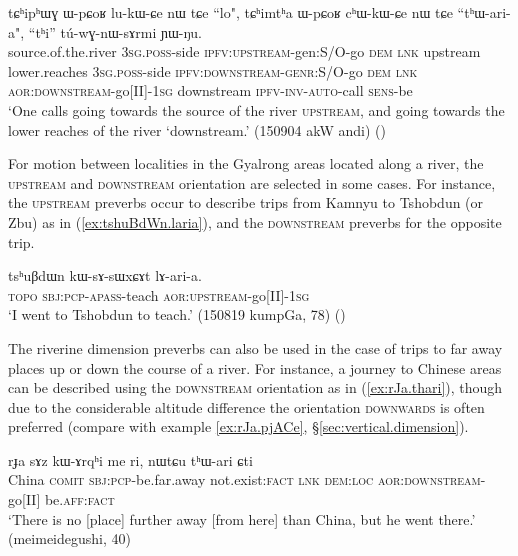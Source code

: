 \begin{exe}
\ex \label{ex:tChiphWG}
\gll   tɕʰipʰɯɣ ɯ-pɕoʁ lu-kɯ-ɕe nɯ tɕe ``lo", tɕʰimtʰa ɯ-pɕoʁ cʰɯ-kɯ-ɕe nɯ tɕe ``tʰɯ-ari-a",  ``tʰi'' tú-wɣ-nɯ-sɤrmi ɲɯ-ŋu.  \\
source.of.the.river \textsc{3sg}.\textsc{poss}-side \textsc{ipfv}:\textsc{upstream}-gen:S/O-go \textsc{dem} \textsc{lnk} upstream lower.reaches \textsc{3sg}.\textsc{poss}-side \textsc{ipfv}:\textsc{downstream}-\textsc{genr}:S/O-go \textsc{dem} \textsc{lnk} \textsc{aor}:\textsc{downstream}-go[II]-\textsc{1sg} downstream \textsc{ipfv}-\textsc{inv}-\textsc{auto}-call \textsc{sens}-be \\
\glt `One calls going towards the source of the river \textsc{upstream}, and going towards the lower reaches of the river `downstream.' (150904 akW andi)
()
\end{exe}

For motion between localities in the Gyalrong areas located along a river, the \textsc{upstream} and \textsc{downstream} orientation are selected in some cases. For instance, the \textsc{upstream} preverbs occur to describe trips from Kamnyu to Tshobdun (or Zbu) as in (\ref{ex:tshuBdWn.laria}), and the \textsc{downstream} preverbs for the opposite trip.

 \begin{exe}
\ex \label{ex:tshuBdWn.laria}
\gll  tsʰuβdɯn kɯ-sɤ-sɯxɕɤt lɤ-ari-a. \\
\textsc{topo} \textsc{sbj}:\textsc{pcp}-\textsc{apass}-teach \textsc{aor}:\textsc{upstream}-go[II]-\textsc{1sg} \\
\glt `I went to Tshobdun to teach.' (150819 kumpGa, 78) ()
\end{exe}

The  riverine dimension preverbs can also be used in the case of trips to far away places up or down the course of a river. For instance, a journey to Chinese areas can be described using the \textsc{downstream} orientation as in (\ref{ex:rJa.thari}), though due to the considerable altitude difference the orientation \textsc{downwards} is often preferred (compare with example \ref{ex:rJa.pjACe}, §\ref{sec:vertical.dimension}).

 \begin{exe}
\ex \label{ex:rJa.thari}
\gll rɟa sɤz kɯ-ɤrqʰi me ri, nɯtɕu tʰɯ-ari ɕti  \\
China \textsc{comit} \textsc{sbj}:\textsc{pcp}-be.far.away not.exist:\textsc{fact} \textsc{lnk} \textsc{dem}:\textsc{loc} \textsc{aor}:\textsc{downstream}-go[II] be.\textsc{aff}:\textsc{fact} \\
\glt `There is no [place] further away [from here] than China, but he went there.' (meimeidegushi, 40)
\end{exe}
 
